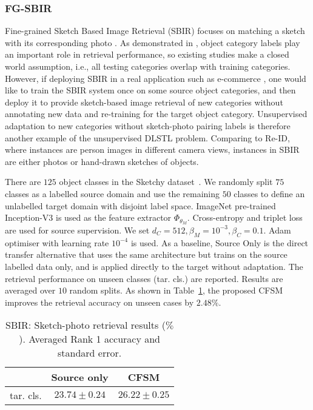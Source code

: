 \documentclass[letterpaper]{article} \usepackage{aaai19}  \usepackage{times}  \usepackage{helvet}  \usepackage{courier}  \usepackage{url}  \usepackage{graphicx}
\begin{document}
\subsubsection{FG-SBIR}
Fine-grained Sketch Based Image Retrieval (SBIR) focuses on matching a sketch with its corresponding photo \cite{sketchy2016}. As demonstrated in \cite{sketchy2016}, object category labels play an important role in retrieval performance, so existing studies make a closed world assumption, i.e., all testing categories overlap with training categories. However, if deploying SBIR in a real application such as e-commerce \cite{yu2016sketchShoe}, one would like to train the SBIR system once on some source object categories, and then deploy it to provide sketch-based image retrieval of new categories without annotating new data and re-training for the target object category. Unsupervised adaptation to new categories
without sketch-photo pairing labels is therefore  another example of the unsupervised DLSTL problem. Comparing to  Re-ID, where instances are person images in different camera views, instances in SBIR are either photos or hand-drawn sketches of objects.

There are $125$ object classes in the Sketchy dataset~\cite{sketchy2016}. We randomly split $75$ classes as a labelled source domain and use the remaining $50$ classes to define an unlabelled target domain with disjoint label space. ImageNet pre-trained Inception-V3 \cite{szegedy2016rethinking} is used as the feature extractor $\Phi_{\theta_M}$. Cross-entropy and triplet loss are used for source supervision.  We set $d_C=512,\beta_M=10^{-3},\beta_C=0.1$. Adam optimiser with learning rate $10^{-4}$ is used. As a baseline, Source Only is the direct transfer alternative that uses the same architecture but trains on the source labelled data only, and is applied directly to the target without adaptation.
The retrieval performance on unseen classes (tar. cls.) are reported. Results are averaged over $10$ random splits.
As shown in Table~\ref{tab:DLSTL_Sketchy}, the proposed CFSM improves the retrieval accuracy on unseen cases by $2.48\%$.

\begin{table}[htb]
\centering
\small
\begin{tabular}{c|c|c}
\hline
          & Source only        & CFSM                 \\ \hline
tar. cls. & $23.74 \pm 0.24$   & $\mathbf{26.22 \pm 0.25}$    \\ \hline
\end{tabular}
\caption{SBIR: Sketch-photo retrieval results ($\%$). Averaged Rank 1 accuracy and standard error.}
\label{tab:DLSTL_Sketchy}
\end{table}
\end{document}
